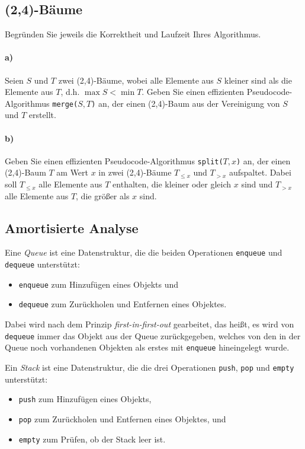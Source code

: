 \documentclass[paper=a4, fontsize=11pt]{scrartcl}
\numberwithin{equation}{section}
\numberwithin{figure}{section}
\numberwithin{table}{section}
\begin{document}
\subsection{(2,4)-Bäume}
Begründen Sie jeweils die Korrektheit und Laufzeit Ihres Algorithmus.

\paragraph{a)} 
Seien $S$ und $T$ zwei (2,4)-Bäume, wobei alle Elemente aus $S$ kleiner sind
als die Elemente aus $T$, d.h. $\max S < \min T$.
Geben Sie einen effizienten Pseudocode-Algorithmus \texttt{merge($S,T$)} an,
der einen (2,4)-Baum aus der Vereinigung von $S$ und $T$ erstellt. \\

\paragraph{b)}
Geben Sie einen effizienten Pseudocode-Algorithmus \texttt{split($T,x$)} an, 
der einen (2,4)-Baum $T$ am Wert $x$ in zwei (2,4)-Bäume $T_{\le x}$ und $T_{> x}$ aufspaltet. 
Dabei soll $T_{\le x}$ alle Elemente aus $T$ enthalten,
die kleiner oder gleich $x$ sind und $T_{> x}$ alle Elemente aus $T$, die größer als $x$ sind. \\

\subsection{Amortisierte Analyse}
Eine \emph{Queue} ist eine Datenstruktur, die die beiden Operationen \texttt{enqueue} und \texttt{dequeue} unterstützt:
%
\begin{itemize}
\item \texttt{enqueue} zum Hinzufügen eines Objekts und
\item \texttt{dequeue} zum Zurückholen und Entfernen eines Objektes.
\end{itemize}

\noindent Dabei wird nach dem Prinzip \emph{first-in-first-out} gearbeitet, das heißt, es wird von \texttt{dequeue} immer das Objekt aus der Queue zurückgegeben, welches von den in der Queue noch vorhandenen Objekten als erstes mit \texttt{enqueue} hineingelegt wurde. 

\smallskip
\noindent
Ein \emph{Stack} ist eine Datenstruktur, die die drei Operationen
\texttt{push}, \texttt{pop} und \texttt{empty} unterstützt:
%
\begin{itemize}
\item \texttt{push} zum Hinzufügen eines Objekts,
\item \texttt{pop} zum Zurückholen und Entfernen eines Objektes, und
\item \texttt{empty} zum Prüfen, ob der Stack leer ist.
\end{itemize}
\end{document}
